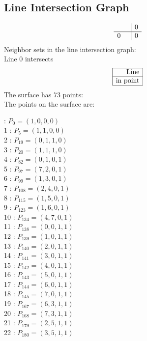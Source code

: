\documentclass{article}
\begin{document}
{\subsection*{Line Intersection Graph}
{\arraycolsep=1pt
$$
\begin{array}{rr|*{1}r}
 &  & 0\\
\hline
0 &  & 0\\
\end{array}
$$
}%
Neighbor sets in the line intersection graph:\\
Line 0 intersects 
$$
\begin{array}{|r*{0}{|c}|}
\hline
\mbox{Line} \\
\hline
\mbox{in point} \\
\hline
\end{array}
$$
The surface has 73 points:\\
The points on the surface are:\\
\begin{multicols}{3}
 : $P_{0}=( 1, 0, 0, 0 )$\\
1 : $P_{5}=( 1, 1, 0, 0 )$\\
2 : $P_{19}=( 0, 1, 1, 0 )$\\
3 : $P_{20}=( 1, 1, 1, 0 )$\\
4 : $P_{82}=( 0, 1, 0, 1 )$\\
5 : $P_{97}=( 7, 2, 0, 1 )$\\
6 : $P_{99}=( 1, 3, 0, 1 )$\\
7 : $P_{108}=( 2, 4, 0, 1 )$\\
8 : $P_{115}=( 1, 5, 0, 1 )$\\
9 : $P_{123}=( 1, 6, 0, 1 )$\\
10 : $P_{134}=( 4, 7, 0, 1 )$\\
11 : $P_{138}=( 0, 0, 1, 1 )$\\
12 : $P_{139}=( 1, 0, 1, 1 )$\\
13 : $P_{140}=( 2, 0, 1, 1 )$\\
14 : $P_{141}=( 3, 0, 1, 1 )$\\
15 : $P_{142}=( 4, 0, 1, 1 )$\\
16 : $P_{143}=( 5, 0, 1, 1 )$\\
17 : $P_{144}=( 6, 0, 1, 1 )$\\
18 : $P_{145}=( 7, 0, 1, 1 )$\\
19 : $P_{167}=( 6, 3, 1, 1 )$\\
20 : $P_{168}=( 7, 3, 1, 1 )$\\
21 : $P_{179}=( 2, 5, 1, 1 )$\\
22 : $P_{180}=( 3, 5, 1, 1 )$\\

\end{multicols}}
\end{document}
